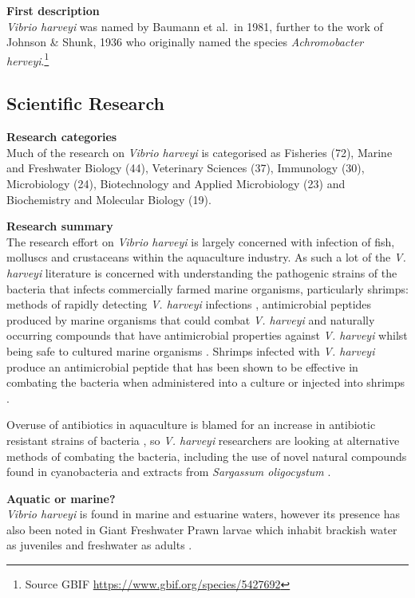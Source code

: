 \documentclass[openany]{book}
\let\rmarkdownfootnote\footnote%
\def\footnote{\protect\rmarkdownfootnote}
\theoremstyle{definition}
\theoremstyle{definition}
\theoremstyle{definition}
\theoremstyle{remark}
\begin{document}
\textbf{First description}\\
\emph{Vibrio harveyi} was named by Baumann et al.~in 1981, further to
the work of Johnson \& Shunk, 1936 who originally named the species
\emph{Achromobacter herveyi}.\footnote{Source GBIF
  \url{https://www.gbif.org/species/5427692}}

\hypertarget{scientific-research-8}{%
\subsection{Scientific Research}\label{scientific-research-8}}

\textbf{Research categories}\\
Much of the research on \emph{Vibrio harveyi} is categorised as
Fisheries (72), Marine and Freshwater Biology (44), Veterinary Sciences
(37), Immunology (30), Microbiology (24), Biotechnology and Applied
Microbiology (23) and Biochemistry and Molecular Biology (19).

\textbf{Research summary}\\
The research effort on \emph{Vibrio harveyi} is largely concerned with
infection of fish, molluscs and crustaceans within the aquaculture
industry. As such a lot of the \emph{V. harveyi} literature is concerned
with understanding the pathogenic strains of the bacteria that infects
commercially farmed marine organisms, particularly shrimps: methods of
rapidly detecting \emph{V. harveyi} infections \citep{Conejero_2003},
antimicrobial peptides produced by marine organisms that could combat
\emph{V. harveyi} and naturally occurring compounds that have
antimicrobial properties against \emph{V. harveyi} whilst being safe to
cultured marine organisms \citep{Ponprateep_2009, Maneechote_2016}.
Shrimps infected with \emph{V. harveyi} produce an antimicrobial peptide
that has been shown to be effective in combating the bacteria when
administered into a culture or injected into shrimps
\citep{Ponprateep_2009}.

Overuse of antibiotics in aquaculture is blamed for an increase in
antibiotic resistant strains of bacteria \citep{Elmahdi_2016}, so
\emph{V. harveyi} researchers are looking at alternative methods of
combating the bacteria, including the use of novel natural compounds
found in cyanobacteria \citep{Maneechote_2016} and extracts from
\emph{Sargassum oligocystum} \citep{Baleta_2011}.

\textbf{Aquatic or marine?}\\
\emph{Vibrio harveyi} is found in marine and estuarine waters, however
its presence has also been noted in Giant Freshwater Prawn larvae which
inhabit brackish water as juveniles and freshwater as adults
\citep{Pande_2013}.
\end{document}
